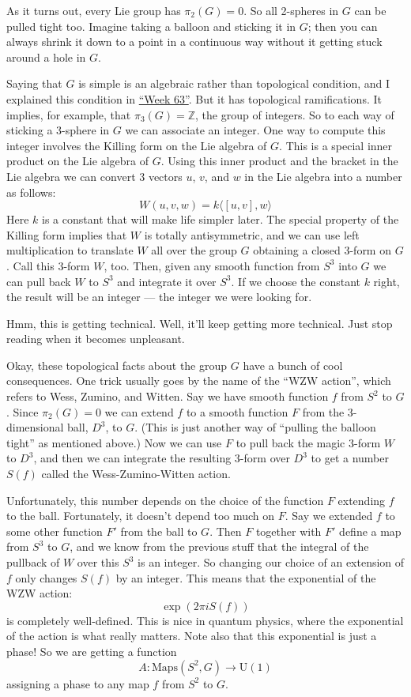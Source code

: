 \documentclass{article}
\begin{document}
As it turns out, every Lie group has \(\pi_2(G) = 0\). So all 2-spheres
in \(G\) can be pulled tight too. Imagine taking a balloon and sticking
it in \(G\); then you can always shrink it down to a point in a
continuous way without it getting stuck around a hole in \(G\).

Saying that \(G\) is simple is an algebraic rather than topological
condition, and I explained this condition in
\protect\hyperlink{week63}{``Week 63''}. But it has topological
ramifications. It implies, for example, that \(\pi_3(G) = \mathbb{Z}\),
the group of integers. So to each way of sticking a 3-sphere in \(G\) we
can associate an integer. One way to compute this integer involves the
Killing form on the Lie algebra of \(G\). This is a special inner
product on the Lie algebra of \(G\). Using this inner product and the
bracket in the Lie algebra we can convert 3 vectors \(u\), \(v\), and
\(w\) in the Lie algebra into a number as follows:
\[W(u,v,w) = k \langle [u,v],w \rangle\] Here \(k\) is a constant that
will make life simpler later. The special property of the Killing form
implies that \(W\) is totally antisymmetric, and we can use left
multiplication to translate \(W\) all over the group \(G\) obtaining a
closed 3-form on \(G\). Call this 3-form \(W\), too. Then, given any
smooth function from \(S^3\) into \(G\) we can pull back \(W\) to
\(S^3\) and integrate it over \(S^3\). If we choose the constant \(k\)
right, the result will be an integer --- the integer we were looking
for.

Hmm, this is getting technical. Well, it'll keep getting more technical.
Just stop reading when it becomes unpleasant.

Okay, these topological facts about the group \(G\) have a bunch of cool
consequences. One trick usually goes by the name of the ``WZW action'',
which refers to Wess, Zumino, and Witten. Say we have smooth function
\(f\) from \(S^2\) to \(G\). Since \(\pi_2(G) = 0\) we can extend \(f\)
to a smooth function \(F\) from the 3-dimensional ball, \(D^3\), to
\(G\). (This is just another way of ``pulling the balloon tight'' as
mentioned above.) Now we can use \(F\) to pull back the magic 3-form
\(W\) to \(D^3\), and then we can integrate the resulting 3-form over
\(D^3\) to get a number \(S(f)\) called the Wess-Zumino-Witten action.

Unfortunately, this number depends on the choice of the function \(F\)
extending \(f\) to the ball. Fortunately, it doesn't depend too much on
\(F\). Say we extended \(f\) to some other function \(F'\) from the ball
to \(G\). Then \(F\) together with \(F'\) define a map from \(S^3\) to
\(G\), and we know from the previous stuff that the integral of the
pullback of \(W\) over this \(S^3\) is an integer. So changing our
choice of an extension of \(f\) only changes \(S(f)\) by an integer.
This means that the exponential of the WZW action:
\[\exp(2 \pi i S(f))\] is completely well-defined. This is nice in
quantum physics, where the exponential of the action is what really
matters. Note also that this exponential is just a phase! So we are
getting a function \[A\colon\mathrm{Maps}(S^2,G)\to \mathrm{U}(1)\]
assigning a phase to any map \(f\) from \(S^2\) to \(G\).
\end{document}
